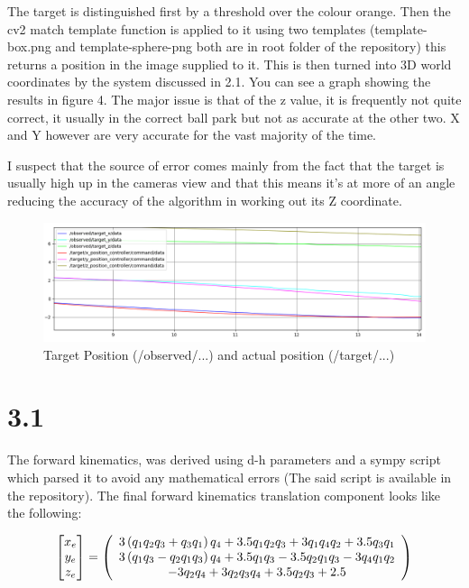 \documentclass{report}
\let\cos\relax
\let\sin\relax
\newcommand{\sin}[1]{\mathit{S}_{#1}}
\newcommand{\cos}[1]{\mathit{C}_{#1}}
\begin{document}
The target is distinguished first by a threshold over the colour orange. Then the cv2 match template function is applied to it using two templates
(template-box.png and template-sphere-png both are in root folder of the repository) this returns a position in the image supplied to it. This is then
turned into 3D world coordinates by the system discussed in 2.1. You can see a graph showing the results in figure 4. The major issue is that of the z value, it is 
frequently not quite correct, it usually in the correct ball park but not as accurate at the other two. X and Y however are very accurate for the vast majority of the time.

I suspect that the source of error comes mainly from the fact that the target is usually high up in the cameras view and that this means it's at more of an angle
reducing the accuracy of the algorithm in working out its Z coordinate.

\begin{figure}
    \includegraphics[width=\linewidth]{target.png}
    \caption{Target Position (/observed/...) and actual position (/target/...)}
\end{figure}

\section*{3.1}

The forward kinematics, was derived using d-h parameters and a sympy script which parsed it to avoid any mathematical errors (The said script is available in the repository). The final forward kinematics translation component looks like the following:

\begin{equation*}
\begin{bmatrix}
           x_{e} \\
           y_{e} \\
           z_{e}
\end{bmatrix} = 
\left(\begin{array}{c} %
    3 \left(\sin{q_{1}} \sin{q_{2}} \cos{q_{3}} + \sin{q_{3}} \cos{q_{1}}\right) \cos{q_{4}}  %
    + 3.5 \sin{q_{1}} \sin{q_{2}} \cos{q_{3}} %
    + 3 \sin{q_{1}} \sin{q_{4}} \cos{q_{2} } %
    + 3.5 \sin{q_{3}} \cos{q_{1}} %
    \\
    3 \left(\sin{q_{1}} \sin{q_{3}} %
    - \sin{q_{2}} \cos{q_{1}} \cos{q_{3}}\right) \cos{q_{4}} %
    + 3.5 \sin{q_{1}} \sin{q_{3}} %
    - 3.5 \sin{q_{2}} \cos{q_{1}} \cos{q_{3}} %
    - 3 \sin{q_{4}} \cos{q_{1}} \cos{q_{2}} %
    \\
    - 3 \sin{q_{2}} \sin{q_{4}} %
    + 3 \cos{q_{2}} \cos{q_{3}} \cos{q_{4}} %
    + 3.5 \cos{q_{2}} \cos{q_{3}} + 2.5
    \end{array}\right)
\end{equation*}
\end{document}
